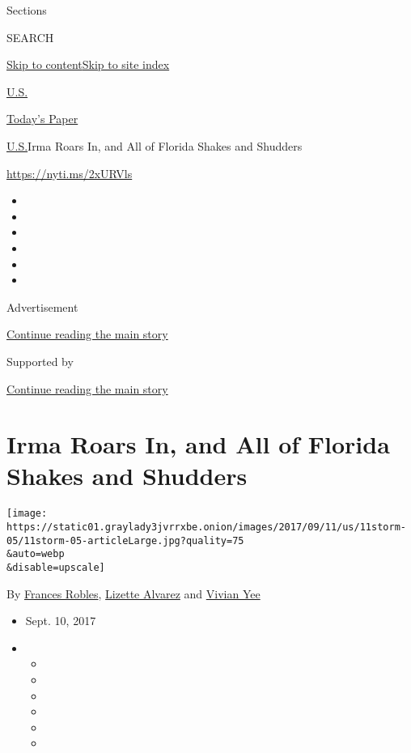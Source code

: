 Sections

SEARCH

\protect\hyperlink{site-content}{Skip to
content}\protect\hyperlink{site-index}{Skip to site index}

\href{https://www.nytimes3xbfgragh.onion/section/us}{U.S.}

\href{https://myaccount.nytimes3xbfgragh.onion/auth/login?response_type=cookie\&client_id=vi}{}

\href{https://www.nytimes3xbfgragh.onion/section/todayspaper}{Today's
Paper}

\href{/section/us}{U.S.}\textbar{}Irma Roars In, and All of Florida
Shakes and Shudders

\url{https://nyti.ms/2xURVls}

\begin{itemize}
\item
\item
\item
\item
\item
\item
\end{itemize}

Advertisement

\protect\hyperlink{after-top}{Continue reading the main story}

Supported by

\protect\hyperlink{after-sponsor}{Continue reading the main story}

\hypertarget{irma-roars-in-and-all-of-florida-shakes-and-shudders}{%
\section{Irma Roars In, and All of Florida Shakes and
Shudders}\label{irma-roars-in-and-all-of-florida-shakes-and-shudders}}

\texttt{[image: https://static01.graylady3jvrrxbe.onion/images/2017/09/11/us/11storm-05/11storm-05-articleLarge.jpg?quality=75\\\&auto=webp\\\&disable=upscale]}

By \href{http://www.nytimes3xbfgragh.onion/by/frances-robles}{Frances
Robles},
\href{http://www.nytimes3xbfgragh.onion/by/lizette-alvarez}{Lizette
Alvarez} and
\href{http://www.nytimes3xbfgragh.onion/by/vivian-yee}{Vivian Yee}

\begin{itemize}
\item
  Sept. 10, 2017
\item
  \begin{itemize}
  \item
  \item
  \item
  \item
  \item
  \item
  \end{itemize}
\end{itemize}

